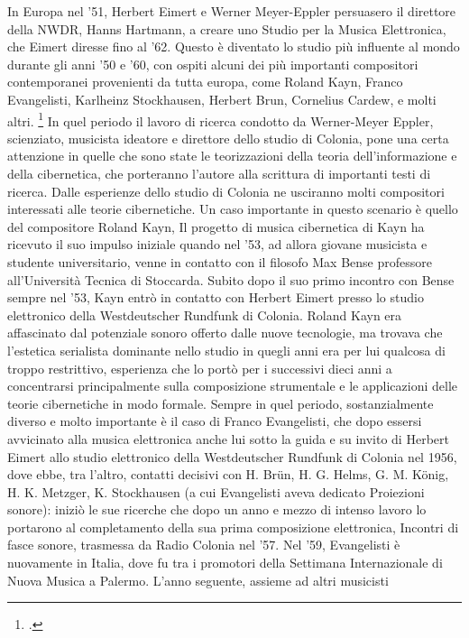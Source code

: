 In Europa nel '51, Herbert Eimert e Werner Meyer-Eppler persuasero il direttore della NWDR, 
Hanns Hartmann,
a creare uno Studio per la Musica Elettronica, che Eimert diresse fino al '62.
Questo è diventato lo studio più influente al mondo durante gli anni '50 e '60,
con ospiti alcuni dei più importanti compositori contemporanei provenienti da tutta europa,
come Roland Kayn, Franco Evangelisti, Karlheinz Stockhausen, Herbert Brun,
Cornelius Cardew, e molti altri. \footcite{EMSColonia}
In quel periodo il lavoro di ricerca condotto da Werner-Meyer Eppler,
scienziato, musicista ideatore e direttore dello studio di Colonia,
pone una certa attenzione in quelle che sono state
le teorizzazioni della teoria dell'informazione e della cibernetica,
che porteranno l'autore alla scrittura di importanti testi di ricerca.
Dalle esperienze dello studio di Colonia ne usciranno molti compositori interessati 
alle teorie cibernetiche.
Un caso importante in questo scenario è quello del compositore Roland Kayn,
Il progetto di musica cibernetica di Kayn ha ricevuto il suo impulso iniziale
quando nel '53, ad allora giovane musicista e studente universitario,
venne in contatto con il filosofo Max Bense professore all'Università Tecnica di Stoccarda. 
Subito dopo il suo primo incontro con Bense sempre nel '53, Kayn entrò in contatto con Herbert
Eimert presso lo studio elettronico della Westdeutscher Rundfunk di Colonia. 
Roland Kayn era affascinato dal potenziale sonoro offerto dalle nuove tecnologie,
ma trovava che l'estetica serialista dominante nello studio in quegli anni
era per lui qualcosa di troppo restrittivo, esperienza che lo portò
per i successivi dieci anni a concentrarsi
principalmente sulla composizione strumentale e le applicazioni delle teorie 
cibernetiche in modo formale. 
Sempre in quel periodo, sostanzialmente diverso e molto importante 
è il caso di Franco Evangelisti, che dopo essersi avvicinato alla musica elettronica 
anche lui sotto la guida e su invito di Herbert Eimert allo studio elettronico della Westdeutscher Rundfunk di Colonia nel 1956, dove ebbe, tra l’altro, contatti decisivi con H. Brün, H. G. Helms, G. M. König, H. K. Metzger, K. Stockhausen (a cui Evangelisti aveva dedicato Proiezioni sonore): iniziò le sue ricerche che dopo un anno e mezzo di intenso lavoro lo portarono al completamento della sua prima composizione elettronica, Incontri di fasce sonore, trasmessa da Radio Colonia nel '57. 
Nel '59, Evangelisti è nuovamente in Italia, dove fu tra i promotori 
della Settimana Internazionale di Nuova Musica a Palermo. 
L'anno seguente, assieme ad altri musicisti
